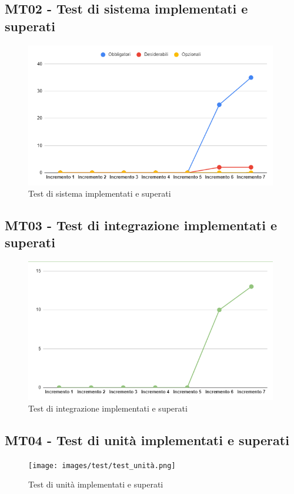 \subsection{MT02 - Test di sistema implementati e superati}
\begin{figure}[H]
	\centering
	\includegraphics[width=11cm]{images/test/test_sistema.png}
	\caption{Test di sistema implementati e superati}
\end{figure}


\subsection{MT03 - Test di integrazione implementati e superati}
\begin{figure}[H]
	\centering
	\includegraphics[width=11cm]{images/test/test_integrazione.png}
	\caption{Test di integrazione implementati e superati}
\end{figure}

\subsection{MT04 - Test di unità implementati e superati}
\begin{figure}[H]
	\centering
	\texttt{[image: images/test/test\_unità.png]}
	\caption{Test di unità implementati e superati}
\end{figure}